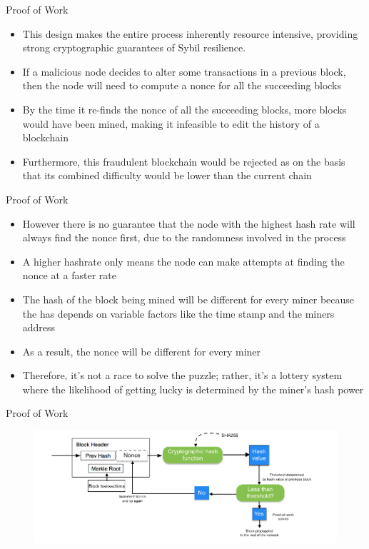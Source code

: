 \documentclass[9pt]{beamer}
\begin{document}

\begin{frame}{Proof of Work}
	\begin{itemize}
		\item This design makes the entire process inherently resource intensive, providing strong cryptographic guarantees of Sybil resilience.
		\item If a malicious node decides to alter some transactions in a previous block, then the node will need to compute a nonce for all the succeeding blocks
		\item By the time it re-finds the nonce of all the succeeding blocks, more blocks would have been mined, making it infeasible to edit the history of a blockchain
		\item Furthermore, this fraudulent blockchain would be rejected as on the basis that its combined difficulty would be lower than the current chain
	\end{itemize}
\end{frame}


\begin{frame}{Proof of Work}
	\begin{itemize}
		\item However there is no guarantee that the node with the highest hash rate will always find the nonce first, due to the randomness involved in the process
		\item A higher hashrate only means the node can make attempts at finding the nonce at a faster rate
		\item The hash of the block being mined will be different for every miner because the has depends on variable factors like the time stamp and the miners address
		\item As a result, the nonce will be different for every miner
		\item Therefore, it's not a race to solve the puzzle; rather, it's a lottery system where the likelihood of getting lucky is determined by the miner's hash power
	\end{itemize}
\end{frame}


\begin{frame}{Proof of Work}
	\begin{figure}[]
		\centering
		\includegraphics  [scale=0.35]{Images/pow}
	\end{figure}
\end{frame}
\end{document}
